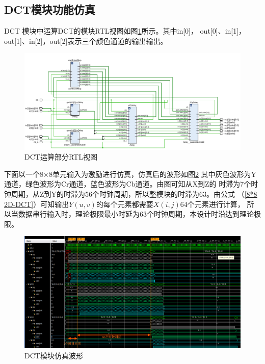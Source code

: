 \documentclass{article}
\numberwithin {equation}{section}
\begin{document}
\begin{spacing}{1.25}
  \subsection{DCT模块功能仿真}
    \vspace{1em}
    DCT 模块中运算DCT的模块RTL视图如图\ref{DCTSchematice}所示。其中in[0]，
    out[0]、in[1]，out[1]、in[2]，out[2]表示三个颜色通道的输出输出。
    \begin{figure}[H]
      \centering
      \includegraphics[scale=0.5]{./pictures/DCTSchematice.png}
      \caption{DCT运算部分RTL视图}
      \label{DCTSchematice}
    \end{figure}
    下面以一个8×8单元输入为激励进行仿真，仿真后的波形如图\ref{DCTSimulationWave}
    其中灰色波形为Y通道，绿色波形为Cr通道，蓝色波形为Cb通道。由图可知从X到Z的
    时滞为7个时钟周期，从Z到Y的时滞为56个时钟周期，所以整模块的时滞为63。由公式
    （\ref{8*8 2D-DCT}）可知输出$Y(u,v)$的每个元素都需要$X(i,j)$64个元素进行计算，
    所以当数据串行输入时，理论极限最小时延为63个时钟周期，本设计时沿达到理论极限。
      \begin{figure}[H]
        \centering
        \includegraphics[scale=0.375]{./pictures/DCT模块仿真.png}
        \caption{DCT模块仿真波形}
        \label{DCTSimulationWave}
      \end{figure}


\end{spacing}
\end{document}
